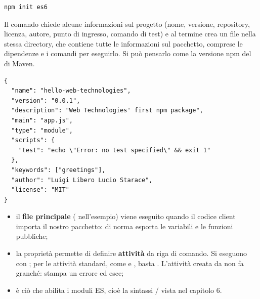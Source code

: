 \begin{lstlisting}[style=shell]
npm init es6
\end{lstlisting}

Il comando chiede alcune informazioni sul progetto (nome, versione, repository,
licenza, autore, punto di ingresso, comando di test) e al termine crea un file
 nella stessa directory, che contiene tutte le informazioni
sul pacchetto, comprese le dipendenze e i comandi per eseguirlo. Si può pensarlo
come la versione npm del  di Maven.

\begin{affianco}[0.6][c]
\begin{lstlisting}[style=json, name=package.json]
{
  "name": "hello-web-technologies",
  "version": "0.0.1",
  "description": "Web Technologies' first npm package",
  "main": "app.js",
  "type": "module",
  "scripts": {
    "test": "echo \"Error: no test specified\" && exit 1"
  },
  "keywords": ["greetings"],
  "author": "Luigi Libero Lucio Starace",
  "license": "MIT"
}
\end{lstlisting}
\risultato
\begin{immagine}
\end{immagine}
\end{affianco}

\begin{itemize}
  \item il \textbf{file principale} ( nell'esempio) viene eseguito
        quando il codice client importa il nostro pacchetto: di norma esporta le
        variabili e le funzioni pubbliche;
  \item la proprietà  permette di definire \textbf{attività} da
        riga di comando. Si eseguono con ; per le attività
        standard, come  e , basta .
        L'attività  creata da  non fa granché: stampa
        un errore ed esce;
  \item {} è ciò che abilita i moduli ES, cioè la sintassi
        / vista nel capitolo 6.
\end{itemize}

